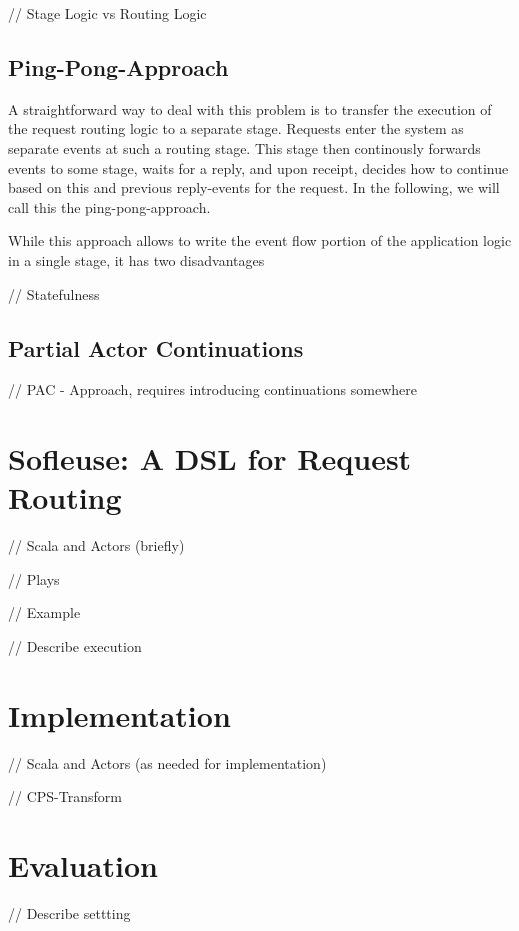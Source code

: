 \documentclass{sig-alternate}
\begin{document}
          
// Stage Logic vs Routing Logic
                                                  
\subsection{Ping-Pong-Approach}

A straightforward way to deal with this problem is to transfer the execution of the request routing
logic to a separate stage. Requests enter the system as separate events at such a routing stage.
This stage then continously forwards events to some stage, waits for a reply, and upon receipt,
decides how to continue based on this and previous reply-events for the request. In the following,
we will call this the ping-pong-approach.
                               
While this approach allows to write the event flow portion of the application logic in a single
stage, it has two disadvantages

// Statefulness

\subsection{Partial Actor Continuations}

// PAC - Approach, requires introducing continuations somewhere


\section{Sofleuse: A DSL for Request Routing}
    
// Scala and Actors (briefly)
          
// Plays

// Example

// Describe execution

           
\section{Implementation}
                  
// Scala and Actors (as needed for implementation)

// CPS-Transform 


\section{Evaluation}

// Describe settting
\end{document}
